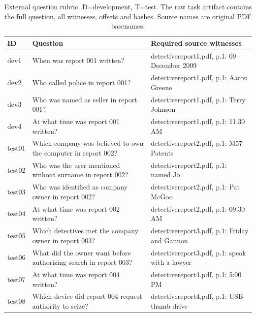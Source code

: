 \begin{table}[t]\centering\scriptsize

\caption{External question rubric. D=development, T=test. The raw task artifact contains the full question, all witnesses, offsets and hashes. Source names are original PDF basenames.}

\begin{tabular}{p{}p{}p{}}\toprule ID & Question & Required source witnesses\\\midrule

dev1 & When was report 001 written? & detectivereport1.pdf, p.1: 09 December 2009\\

dev2 & Who called police in report 001? & detectivereport1.pdf, p.1: Aaron Greene\\

dev3 & Who was named as seller in report 001? & detectivereport1.pdf, p.1: Terry Johnson\\

dev4 & At what time was report 001 written? & detectivereport1.pdf, p.1: 11:30 AM\\

test01 & Which company was believed to own the computer in report 002? & detectivereport2.pdf, p.1: M57 Patents\\

test02 & Who was the user mentioned without surname in report 002? & detectivereport2.pdf, p.1: named Jo\\

test03 & Who was identified as company owner in report 002? & detectivereport2.pdf, p.1: Pat McGoo\\

test04 & At what time was report 002 written? & detectivereport2.pdf, p.1: 09:30 AM\\

test05 & Which detectives met the company owner in report 003? & detectivereport3.pdf, p.1: Friday and Gannon\\

test06 & What did the owner want before authorizing search in report 003? & detectivereport3.pdf, p.1: speak with a lawyer\\

test07 & At what time was report 004 written? & detectivereport4.pdf, p.1: 5:00 PM\\

test08 & Which device did report 004 request authority to seize? & detectivereport4.pdf, p.1: USB thumb drive\\


\end{tabular}
\end{table}
